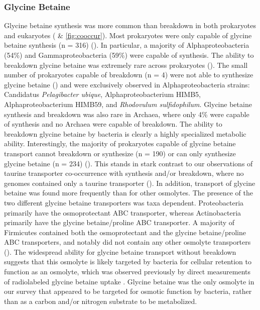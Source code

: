 \documentclass[utf8]{frontiersSCNS} %
\begin{document}
\subsubsection*{Glycine Betaine}
Glycine betaine synthesis was more common than breakdown in both prokaryotes and eukaryotes ( \& \ref{fig:cooccur}). Most prokaryotes were only capable of glycine betaine synthesis (n = 316) (). In particular, a majority of Alphaproteobacteria (54\%) and Gammaproteobacteria (59\%) were capable of synthesis. The ability to breakdown glycine betaine was extremely rare across prokaryotes (). The small number of prokaryotes capable of breakdown (n = 4) were not able to synthesize glycine betaine () and were exclusively observed in Alphaproteobacteria strains: Candidatus \emph{Pelagibacter ubique}, Alphaproteobacterium HIMB5, Alphaproteobacterium HIMB59, and \emph{Rhodovulum sulfidophilum}. Glycine betaine synthesis and breakdown was also rare in Archaea, where only 4\% were capable of synthesis and no Archaea were capable of breakdown. The ability to breakdown glycine betaine by bacteria is clearly a highly specialized metabolic ability. Interestingly, the majority of prokaryotes capable of glycine betaine transport cannot breakdown or synthesize (n = 190) or can only synthesize glycine betaine (n = 234)  (). This stands in stark contrast to our observations of taurine transporter co-occurrence with synthesis and/or breakdown, where no genomes contained only a taurine transporter (). In addition, transport of glycine betaine was found more frequently than for other osmolytes. The presence of the two different glycine betaine transporters was taxa dependent. Proteobacteria primarily have the osmoprotectant ABC transporter, whereas Actinobacteria primarily have the glycine betaine/proline ABC transporter. A majority of Firmicutes contained both the osmoprotectant and the glycine betaine/proline ABC transporters, and notably did not contain any other osmolyte transporters (). The widespread ability for glycine betaine transport without breakdown suggests that this osmolyte is likely targeted by bacteria for cellular retention to function as an osmolyte, which was observed previously by direct measurements of radiolabeled glycine betaine uptake \citep{Kiene1998}. Glycine betaine was the only osmolyte in our survey that appeared to be targeted for osmotic function by bacteria, rather than as a carbon and/or nitrogen substrate to be metabolized. 
\end{document}
